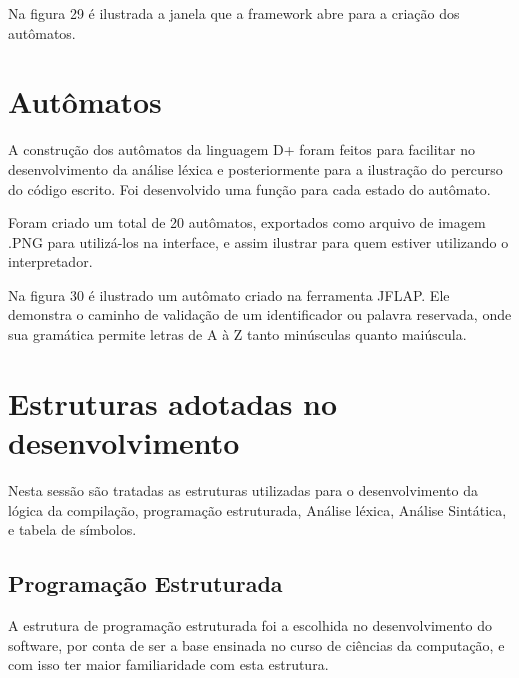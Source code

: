 \documentclass[12pt,oneside,a4paper,chapter=TITLE,section=TITLE,sumario=tradicional]{abntex2}
\begin{document}
Na figura 29 é ilustrada a janela que a framework abre para a criação dos autômatos.

\begin{figure}[htb]
\end{figure}

\section{Autômatos}
\label{sec:automatosmet}

A construção dos autômatos da linguagem D+ foram feitos para facilitar no desenvolvimento da análise léxica e posteriormente para a ilustração do percurso do código escrito. Foi desenvolvido uma função para cada estado do autômato.

Foram criado um total de 20 autômatos, exportados como arquivo de imagem .PNG para utilizá-los na interface, e assim ilustrar para quem estiver utilizando o interpretador.

Na figura 30 é ilustrado um autômato criado na ferramenta JFLAP. Ele demonstra o caminho de validação de um identificador ou palavra reservada, onde sua gramática permite letras de A à Z tanto minúsculas quanto maiúscula.

\begin{figure}[htb]
\end{figure}

\section{Estruturas adotadas no desenvolvimento}
\label{sec:estruturasadotadas}

Nesta sessão são tratadas as estruturas utilizadas para o desenvolvimento da lógica da compilação, programação estruturada, Análise léxica, Análise Sintática, e tabela de símbolos.

\subsection{Programação Estruturada}
\label{subsec:programacaoestruturada}

A estrutura de programação estruturada foi a escolhida no desenvolvimento do software, por conta de ser a base ensinada no curso de ciências da computação, e com isso ter maior familiaridade com esta estrutura.
\end{document}
